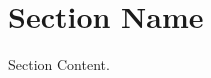\documentclass[book.tex]{subfiles}
\begin{document}
\section{Section Name}

Section Content.
\end{document}

